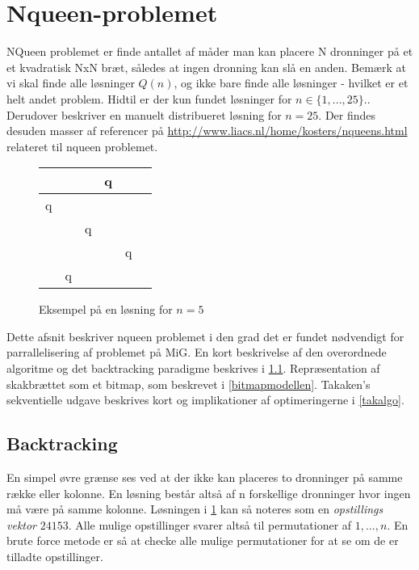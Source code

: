 \documentclass[draft,a4paper,10pt]{article}
\newcommand{\mig}{MiG}
\def\chs#1{{\chessfont#1}}
\begin{document}
\section{Nqueen-problemet}\label{nqueenproblemet}

NQueen problemet er finde antallet af måder man kan placere N dronninger på et et kvadratisk NxN bræt, således at ingen dronning kan slå en anden. Bemærk at vi skal finde alle løsninger $Q(n)$, og ikke bare finde alle løsninger - hvilket er et helt andet problem. Hidtil er der kun fundet løsninger for $n \in \{1,...,25\}$.\cite{sekvenser}. Derudover beskriver \cite{etsi} en manuelt distribueret løsning for $n=25$. Der findes desuden masser af referencer på \url{http://www.liacs.nl/home/kosters/nqueens.html} relateret til nqueen problemet. 

\begin{figure}
\begin{center}
\begin{tabular}{|c|c|c|c|c|c}
\hline	 &  & &   \chs{q} & \\
\hline	\chs{q} & &  &  & \\
\hline	 & & \chs{q} &  &  \\
\hline	 &  &  & & \chs{q} \\
\hline	 & \chs{q} & &  &  \\
\hline
\end{tabular}
\end{center}
\caption{Eksempel på en løsning for $n=5$}
\label{fig:nq5eks}
\end{figure}


Dette afsnit beskriver nqueen problemet i den grad det er fundet nødvendigt for parrallelisering af problemet på \mig. En kort beskrivelse af den overordnede algoritme og det backtracking paradigme beskrives i \ref{backtracking}. Repræsentation af skakbrættet som et bitmap, som beskrevet i \ref{bitmapmodellen}. Takaken's sekventielle udgave beskrives kort og implikationer af optimeringerne i \ref{takalgo}. 


\subsection{Backtracking}\label{backtracking}

En simpel øvre grænse ses ved at der ikke kan placeres to dronninger på samme række eller kolonne. En løsning består altså af n forskellige dronninger hvor ingen må være på samme kolonne. Løsningen i \ref{fig:nq5eks} kan så noteres som en \textit{opstillings vektor} $24153$. Alle mulige opstillinger svarer altså til permutationer af ${1,\ldots,n}$. En brute force metode er så at checke alle mulige permutationer for at se om de er tilladte opstillinger. 
\end{document}
